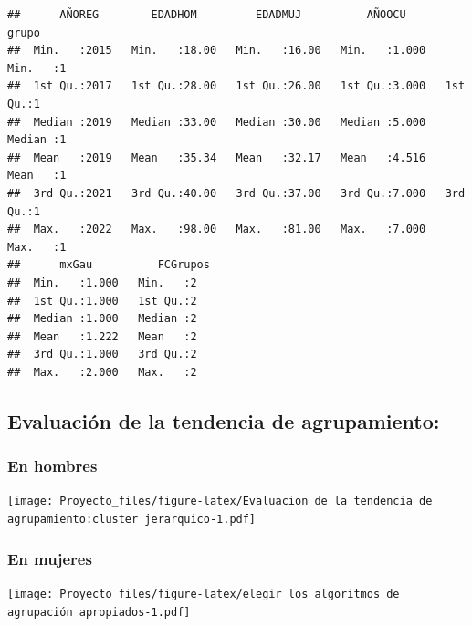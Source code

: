 \documentclass[
]{article}
\begin{document}
\begin{verbatim}
##      AÑOREG        EDADHOM         EDADMUJ          AÑOOCU          grupo  
##  Min.   :2015   Min.   :18.00   Min.   :16.00   Min.   :1.000   Min.   :1  
##  1st Qu.:2017   1st Qu.:28.00   1st Qu.:26.00   1st Qu.:3.000   1st Qu.:1  
##  Median :2019   Median :33.00   Median :30.00   Median :5.000   Median :1  
##  Mean   :2019   Mean   :35.34   Mean   :32.17   Mean   :4.516   Mean   :1  
##  3rd Qu.:2021   3rd Qu.:40.00   3rd Qu.:37.00   3rd Qu.:7.000   3rd Qu.:1  
##  Max.   :2022   Max.   :98.00   Max.   :81.00   Max.   :7.000   Max.   :1  
##      mxGau          FCGrupos
##  Min.   :1.000   Min.   :2  
##  1st Qu.:1.000   1st Qu.:2  
##  Median :1.000   Median :2  
##  Mean   :1.222   Mean   :2  
##  3rd Qu.:1.000   3rd Qu.:2  
##  Max.   :2.000   Max.   :2
\end{verbatim}

\hypertarget{evaluaciuxf3n-de-la-tendencia-de-agrupamiento}{%
\subsection{Evaluación de la tendencia de
agrupamiento:}\label{evaluaciuxf3n-de-la-tendencia-de-agrupamiento}}

\hypertarget{en-hombres}{%
\subsubsection{En hombres}\label{en-hombres}}

\texttt{[image: Proyecto\_files/figure-latex/Evaluacion de la tendencia de agrupamiento:cluster jerarquico-1.pdf]}

\hypertarget{en-mujeres}{%
\subsubsection{En mujeres}\label{en-mujeres}}

\texttt{[image: Proyecto\_files/figure-latex/elegir los algoritmos de agrupación apropiados-1.pdf]}
\end{document}

